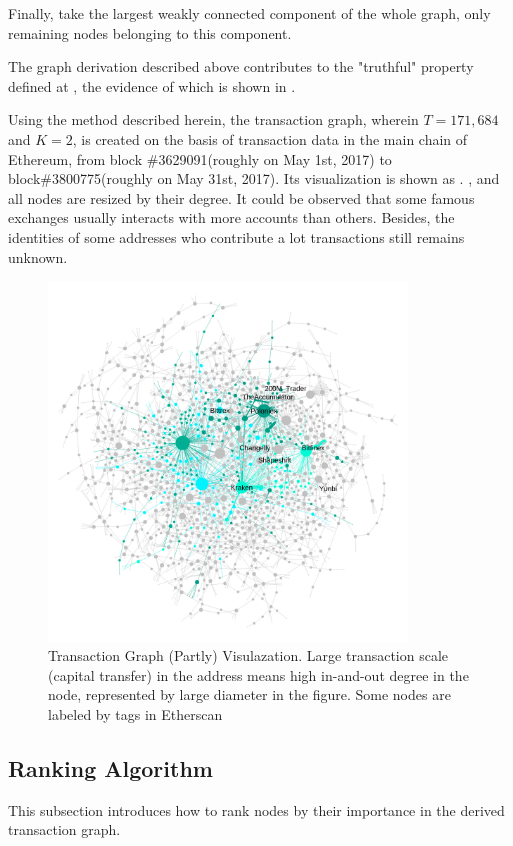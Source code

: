 Finally, take the largest weakly connected component of the whole graph, only remaining nodes belonging to this component.

The graph derivation described above contributes to the "truthful" property defined at , the evidence of which is shown in .

Using the method described herein, the transaction graph, wherein $T=171,684$ and $K=2$, is created on the basis of transaction data in the main chain of Ethereum, from block \#3629091(roughly on May 1st, 2017) to block\#3800775(roughly on May 31st, 2017). Its visualization is shown as . , and all nodes are resized by their degree. It could be observed that some famous exchanges usually interacts with more accounts than others. Besides, the identities of some addresses who contribute a lot transactions still remains unknown. 

\begin{figure}[h]
	\centering
	\includegraphics[width=0.85\textwidth]{figs/wgc1.png}
	\caption{Transaction Graph (Partly) Visulazation. \small{Large transaction scale (capital transfer) in the address means high in-and-out degree in the node, represented by large diameter in the figure. Some nodes are labeled by tags in Etherscan\cite{etherscan}}  }\label{fig:wgc}
\end{figure}

\subsection{Ranking Algorithm} \label{subsec:leaderrank}
This subsection introduces how to rank nodes by their importance in the derived transaction graph.

